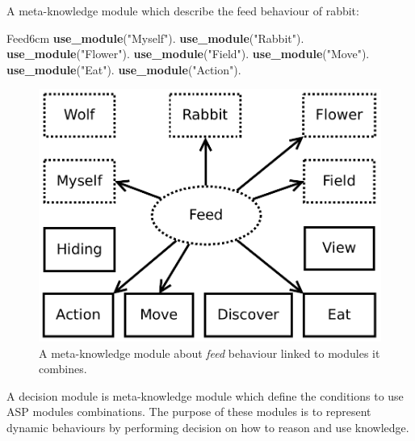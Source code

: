 \documentclass{aamas2012}
\begin{document}
	\begin{example}
		\label{feed_example}
		A meta-knowledge module which describe the feed behaviour of rabbit:\newline
		\begin{module}{Feed}{6cm}
			\textbf{use\_module}("Myself").\newline
			\textbf{use\_module}("Rabbit").\newline
			\textbf{use\_module}("Flower").\newline
			\textbf{use\_module}("Field").\newline
			\textbf{use\_module}("Move").\newline
			\textbf{use\_module}("Eat").\newline
			\textbf{use\_module}("Action").
		\end{module}
	\end{example}
	
	\begin{figure}
		\centering
		\includegraphics[keepaspectratio=true, scale=0.4]{feed.pdf}
		\caption
		{
			\label{feed_figure}
			A meta-knowledge module about \textit{feed} behaviour linked to modules it combines.
		}
	\end{figure}
	
	\begin{definition}
		A decision module is meta-knowledge module which define the conditions to use ASP modules combinations.	
		The purpose of these modules is to represent dynamic behaviours by performing decision on how to reason and use knowledge.
	\end{definition}
	
\end{document}
